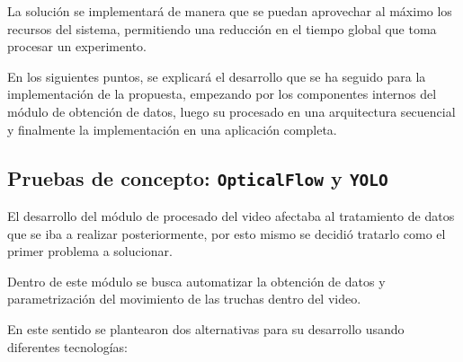 La solución se implementará de manera que se puedan aprovechar al máximo los recursos del sistema, permitiendo una reducción en el tiempo global 
que toma procesar un experimento.

En los siguientes puntos, se explicará el desarrollo que se ha seguido para la implementación de la propuesta, empezando por los componentes internos 
del módulo de obtención de datos, luego su procesado en una arquitectura secuencial y finalmente la implementación en una aplicación completa.

\clearpage
\subsection{Pruebas de concepto: \texttt{OpticalFlow} y \texttt{YOLO}}

El desarrollo del módulo de procesado del video afectaba al tratamiento de datos que se iba a realizar posteriormente, por esto mismo se decidió 
tratarlo como el primer problema a solucionar.

Dentro de este módulo se busca automatizar la obtención de datos y parametrización del movimiento de las truchas dentro del video.

En este sentido se plantearon dos alternativas para su desarrollo usando diferentes tecnologías:

